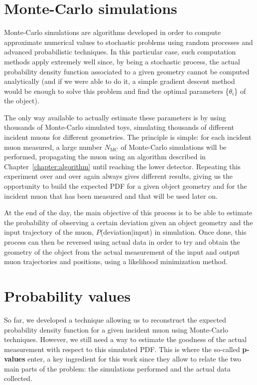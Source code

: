 \documentclass[a4paper, 11pt]{report}
\begin{document}
\section{Monte-Carlo simulations} \label{sec:MC}

Monte-Carlo simulations are algorithms developed in order to compute approximate numerical values to stochastic problems using random processes and advanced probabilistic techniques. In this particular case, such computation methods apply extremely well since, by being a stochastic process, the actual probability density function associated to a given geometry cannot be computed analytically (and if we were able to do it, a simple gradient descent method would be enough to solve this problem and find the optimal parameters \{$\theta_i$\} of the object). 

The only way available to actually estimate these parameters is by using thousands of Monte-Carlo simulated toys, simulating thousands of different incident muons for different geometries. The principle is simple: for each incident muon measured, a large number $N_{\text{MC}}$ of Monte-Carlo simulations will be performed, propagating the muon using an algorithm described in Chapter~\ref{chapter:algorithm} until reaching the lower detector. Repeating this experiment over and over again always gives different results, giving us the opportunity to build the expected PDF for a given object geometry and for the incident muon that has been measured and that will be used later on.

At the end of the day, the main objective of this process is to be able to estimate the probability of observing a certain deviation given an object geometry and the input trajectory of the muon, $P$(deviation$|$input) in simulation. Once done, this process can then be reversed using actual data in order to try and obtain the geometry of the object from the actual measurement of the input and output muon trajectories and positions, using a likelihood minimization method.

\section{Probability values} \label{sec:pValues}

So far, we developed a technique allowing us to reconstruct the expected probability density function for a given incident muon using Monte-Carlo techniques. However, we still need a way to estimate the goodness of the actual measurement with respect to this simulated PDF. This is where the so-called \textbf{p-values} enter, a key ingredient for this work since they allow to relate the two main parts of the problem: the simulations performed and the actual data collected.
\end{document}
